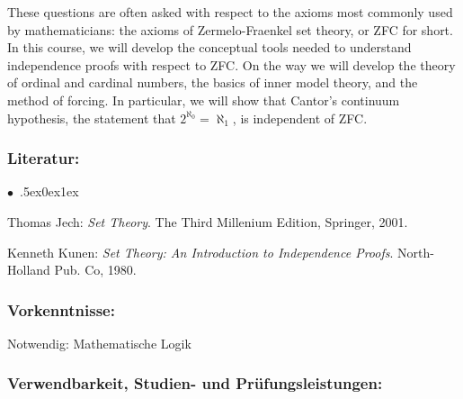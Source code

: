 \documentclass[a4paper,10pt]{article}
\renewenvironment{itemize}{\begin{list}{$\bullet$\ }{\itemsep.5ex\setlength{\topsep}{0.5\itemsep}\parsep0ex\labelsep1ex\settowidth{\labelwidth}{$\bullet$\ }\setlength{\leftmargin}{\labelwidth}\addtolength{\leftmargin}{3ex}\addtolength{\leftmargin}{\labelsep}}}{\end{list}}
\begin{document}
These questions are often asked with respect to the axioms most commonly used by mathematicians: the axioms of Zermelo-Fraenkel set theory, or ZFC for short. In this course, we will develop the conceptual tools needed to understand independence proofs with respect to ZFC. On the way we will develop the theory of ordinal and cardinal numbers, the basics of inner model theory, and the method of forcing. In particular, we will show that Cantor's continuum hypothesis, the statement that $2^{\aleph_0}=\aleph_1$, is independent of ZFC. 

\subsubsection*{\large
    Literatur:
}
\begin{itemize}
\item Thomas Jech: \emph{Set Theory}. The Third Millenium Edition, Springer, 2001. 
\item Kenneth Kunen: \emph{Set Theory: An Introduction to Independence Proofs}. North-Holland Pub. Co, 1980.
\end{itemize}

\subsubsection*{\large
    Vorkenntnisse:
}
Notwendig: Mathematische Logik
\cleardoublepage
\subsubsection*{\large
    Verwendbarkeit, Studien- und Prüfungsleistungen:
}
\end{document}
